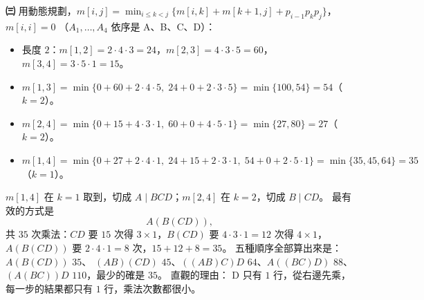 \begin{pastsoln}
\textbf{㈢} 用動態規劃，$m[i,j] = \min_{i \le k < j}\{m[i,k] + m[k+1,j] + p_{i-1} p_k p_j\}$，$m[i,i] = 0$
（$A_1, \ldots, A_4$ 依序是 A、B、C、D）：
\begin{itemize}
\item 長度 $2$：$m[1,2] = 2 \cdot 4 \cdot 3 = 24$，$m[2,3] = 4 \cdot 3 \cdot 5 = 60$，$m[3,4] = 3 \cdot 5 \cdot 1 = 15$。
\item $m[1,3] = \min\{0 + 60 + 2 \cdot 4 \cdot 5,\; 24 + 0 + 2 \cdot 3 \cdot 5\} = \min\{100, 54\} = 54$（$k = 2$）。
\item $m[2,4] = \min\{0 + 15 + 4 \cdot 3 \cdot 1,\; 60 + 0 + 4 \cdot 5 \cdot 1\} = \min\{27, 80\} = 27$（$k = 2$）。
\item $m[1,4] = \min\{0 + 27 + 2 \cdot 4 \cdot 1,\; 24 + 15 + 2 \cdot 3 \cdot 1,\; 54 + 0 + 2 \cdot 5 \cdot 1\}
= \min\{35, 45, 64\} = 35$（$k = 1$）。
\end{itemize}
$m[1,4]$ 在 $k = 1$ 取到，切成 $A \mid BCD$；$m[2,4]$ 在 $k = 2$，切成 $B \mid CD$。 最有效的方式是
\[
A(B(CD)),
\]
共 $35$ 次乘法：$CD$ 要 $15$ 次得 $3 \times 1$，$B(CD)$ 要 $4 \cdot 3 \cdot 1 = 12$ 次得 $4 \times 1$，
$A(B(CD))$ 要 $2 \cdot 4 \cdot 1 = 8$ 次，$15 + 12 + 8 = 35$。 五種順序全部算出來是：$A(B(CD))$ $35$、
$(AB)(CD)$ $45$、$((AB)C)D$ $64$、$A((BC)D)$ $88$、$(A(BC))D$ $110$，最少的確是 $35$。 直觀的理由：
D 只有 $1$ 行，從右邊先乘，每一步的結果都只有 $1$ 行，乘法次數都很小。
\end{pastsoln}
